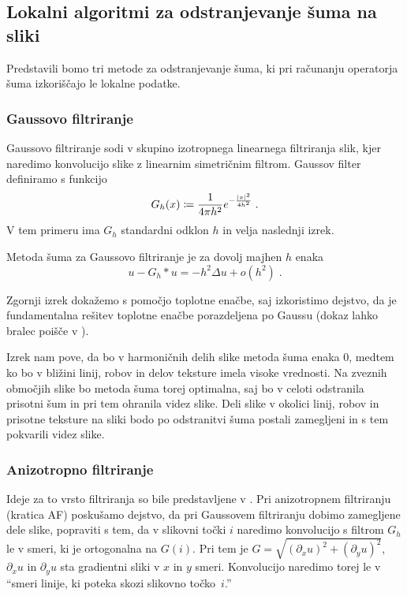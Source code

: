 \subsection{Lokalni algoritmi za odstranjevanje šuma na sliki}
Predstavili bomo tri metode za odstranjevanje šuma, ki pri računanju operatorja šuma izkoriščajo le lokalne podatke.
% 
\subsubsection{Gaussovo filtriranje}
Gaussovo filtriranje sodi v skupino izotropnega linearnega filtriranja slik, kjer naredimo konvolucijo slike z linearnim simetričnim filtrom. Gaussov filter definiramo s funkcijo
$$G_h(x) \coloneqq \frac{1}{4 \pi h^2} e^{- \frac{\left|x\right|^2}{4 h^2}} \;.$$
V tem primeru ima $G_h$ standardni odklon $h$ in velja naslednji izrek.
%
\begin{izrek}
Metoda šuma za Gaussovo filtriranje je za dovolj majhen $h$ enaka
$$u - G_h \ast u = - h^2 \Delta u + o(h^2)\;.$$
\end{izrek}
%
Zgornji izrek dokažemo s pomočjo toplotne enačbe, saj izkoristimo dejstvo, da je fundamentalna rešitev toplotne enačbe porazdeljena po Gaussu (dokaz lahko bralec poišče v \cite{Lind:Gauss-dokaz}).

Izrek nam pove, da bo v harmoničnih delih slike metoda šuma enaka 0, medtem ko bo v bližini linij, robov in delov teksture imela visoke vrednosti. Na zveznih območjih slike bo metoda šuma torej optimalna, saj bo v celoti odstranila prisotni šum in pri tem ohranila videz slike. Deli slike v okolici linij, robov in prisotne teksture na sliki bodo po odstranitvi šuma postali zamegljeni in s tem pokvarili videz slike.
\subsubsection{Anizotropno filtriranje}
Ideje za to vrsto filtriranja so bile predstavljene v \cite{Perona-Malik}. Pri anizotropnem filtriranju (kratica AF) poskušamo dejstvo, da pri Gaussovem filtriranju dobimo zamegljene dele slike, popraviti s tem, da v slikovni točki $i$ naredimo konvolucijo s filtrom $G_h$ le v smeri, ki je ortogonalna na $G(i)$. Pri tem je $G = \sqrt{(\partial_x u)^2 + (\partial_y u)^2}$, $\partial_x u$ in $\partial_y u$ sta gradientni sliki v $x$ in $y$ smeri. Konvolucijo naredimo torej le v ``smeri linije, ki poteka skozi slikovno točko~$i$.''

